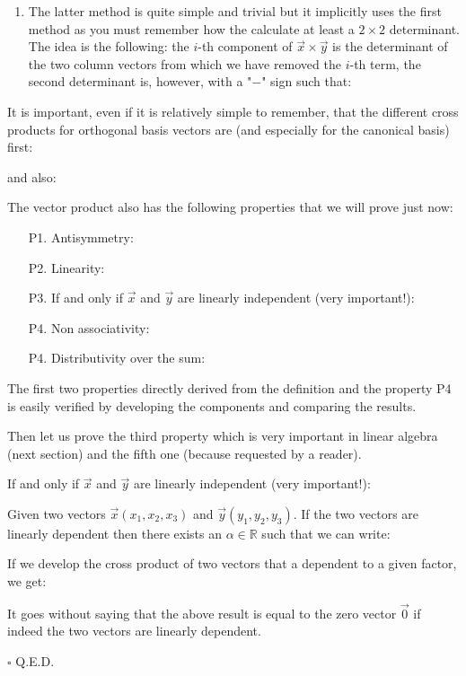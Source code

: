 \begin{tcolorbox}[title=Remark,colframe=black,arc=10pt]
\begin{enumerate}
		
		\item The latter method is quite simple and trivial but it implicitly uses the first method as you must remember how the calculate at least a $2\times 2$ determinant. The idea is the following: the $i$-th component of $\vec{x}\times\vec{y}$ is the determinant of the two column vectors from which we have removed the $i$-th term, the second determinant is, however, with a "$-$" sign such that:
			  
	\end{enumerate}
	\end{tcolorbox}
	
	\pagebreak
	It is important, even if it is relatively simple to remember, that the different cross products for orthogonal basis vectors are (and especially for the canonical basis) first:
	
	and also:
	
	The vector product also has the following properties that we will prove just now:
	  \begin{enumerate}
	  	\item[P1.] Antisymmetry:
	  		
	  		
	  	\item[P2.] Linearity:
	  		
	  		
	  	\item[P3.] If and only if $\vec{x}$ and $\vec{y}$ are linearly independent (very important!):
	  	
	  	
	  	\item[P4.] Non associativity:
	  	
	  	
	  	\item[P4.] Distributivity over the sum:
	  	
	  \end{enumerate}
	  The first two properties directly derived from the definition and the property P4 is easily verified by developing the components and comparing the results.
	  
	 Then let us prove the third property which is very important in linear algebra (next section) and the fifth one (because requested by a reader).
	\begin{theorem}
	If and only if $\vec{x}$ and $\vec{y}$ are linearly independent (very important!):
	
	\end{theorem}
	\begin{dem}
	Given two vectors $\vec{x}(x_1,x_2,x_3)$ and $\vec{y}(y_1,y_2,y_3)$. If the two vectors are linearly dependent then there exists an $\alpha \in \mathbb{R}$ such that we can write:
	
	If we develop the cross product of two vectors that a dependent to a given factor, we get:
	
	It goes without saying that the above result is equal to the zero vector $\vec{0}$ if indeed the two vectors are linearly dependent.
	\begin{flushright}
		$\square$  Q.E.D.
	\end{flushright}
	\end{dem}
	
